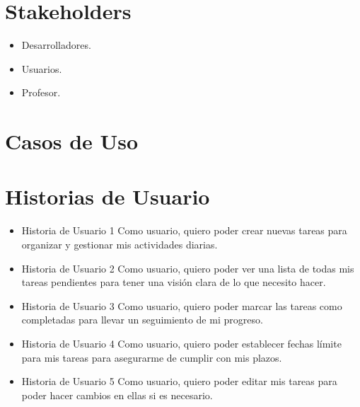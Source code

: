     \section{Stakeholders}
    \begin{itemize}
        \item Desarrolladores.
        \item Usuarios.
        \item Profesor.
    \end{itemize}

	\section{Casos de Uso}
	 
    
    \section{Historias de Usuario}
    \begin{itemize}
        \item Historia de Usuario 1
        Como usuario, quiero poder crear nuevas tareas para organizar y gestionar mis actividades diarias.
        
        \item Historia de Usuario 2
        Como usuario, quiero poder ver una lista de todas mis tareas pendientes para tener una visión clara de lo que necesito hacer.
        
        \item Historia de Usuario 3
        Como usuario, quiero poder marcar las tareas como completadas para llevar un seguimiento de mi progreso.
        
        \item Historia de Usuario 4
        Como usuario, quiero poder establecer fechas límite para mis tareas para asegurarme de cumplir con mis plazos.

        \item Historia de Usuario 5
        Como usuario, quiero poder editar mis tareas para poder hacer cambios en ellas si es necesario.
    \end{itemize}


    
    
    
